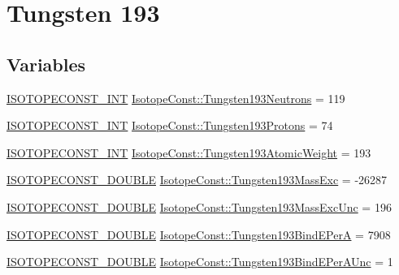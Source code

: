 \hypertarget{group___isotope_const-_tungsten-_w193}{}\section{Tungsten 193}
\label{group___isotope_const-_tungsten-_w193}
\subsection*{Variables}
\begin{DoxyCompactItemize}
\item 
\mbox{\hyperlink{group___isotope_const-_macros_ga5f18360b3e99483a35c32d789e62621c}{I\+S\+O\+T\+O\+P\+E\+C\+O\+N\+S\+T\+\_\+\+I\+NT}} \mbox{\hyperlink{group___isotope_const-_tungsten-_w193_ga136600f2184b22e76918b63e50a3f132}{Isotope\+Const\+::\+Tungsten193\+Neutrons}} = 119
\item 
\mbox{\hyperlink{group___isotope_const-_macros_ga5f18360b3e99483a35c32d789e62621c}{I\+S\+O\+T\+O\+P\+E\+C\+O\+N\+S\+T\+\_\+\+I\+NT}} \mbox{\hyperlink{group___isotope_const-_tungsten-_w193_gab760aff84a24eb8ddcc2ed2c1dfe23c0}{Isotope\+Const\+::\+Tungsten193\+Protons}} = 74
\item 
\mbox{\hyperlink{group___isotope_const-_macros_ga5f18360b3e99483a35c32d789e62621c}{I\+S\+O\+T\+O\+P\+E\+C\+O\+N\+S\+T\+\_\+\+I\+NT}} \mbox{\hyperlink{group___isotope_const-_tungsten-_w193_ga591f8240aa7464aafa61689a35c10f7c}{Isotope\+Const\+::\+Tungsten193\+Atomic\+Weight}} = 193
\item 
\mbox{\hyperlink{group___isotope_const-_macros_ga8f45a7272ce02c0b4c65c44636ed719a}{I\+S\+O\+T\+O\+P\+E\+C\+O\+N\+S\+T\+\_\+\+D\+O\+U\+B\+LE}} \mbox{\hyperlink{group___isotope_const-_tungsten-_w193_ga9b5a76d3e4bddf486656b82c55954373}{Isotope\+Const\+::\+Tungsten193\+Mass\+Exc}} = -\/26287
\item 
\mbox{\hyperlink{group___isotope_const-_macros_ga8f45a7272ce02c0b4c65c44636ed719a}{I\+S\+O\+T\+O\+P\+E\+C\+O\+N\+S\+T\+\_\+\+D\+O\+U\+B\+LE}} \mbox{\hyperlink{group___isotope_const-_tungsten-_w193_ga638f089adf44d36eb0f9e442312e5023}{Isotope\+Const\+::\+Tungsten193\+Mass\+Exc\+Unc}} = 196
\item 
\mbox{\hyperlink{group___isotope_const-_macros_ga8f45a7272ce02c0b4c65c44636ed719a}{I\+S\+O\+T\+O\+P\+E\+C\+O\+N\+S\+T\+\_\+\+D\+O\+U\+B\+LE}} \mbox{\hyperlink{group___isotope_const-_tungsten-_w193_gaa3a24c1858792c9418b514709cb72a50}{Isotope\+Const\+::\+Tungsten193\+Bind\+E\+PerA}} = 7908
\item 
\mbox{\hyperlink{group___isotope_const-_macros_ga8f45a7272ce02c0b4c65c44636ed719a}{I\+S\+O\+T\+O\+P\+E\+C\+O\+N\+S\+T\+\_\+\+D\+O\+U\+B\+LE}} \mbox{\hyperlink{group___isotope_const-_tungsten-_w193_gad3aa2b283326cf20e223022290788d4f}{Isotope\+Const\+::\+Tungsten193\+Bind\+E\+Per\+A\+Unc}} = 1

\end{DoxyCompactItemize}
